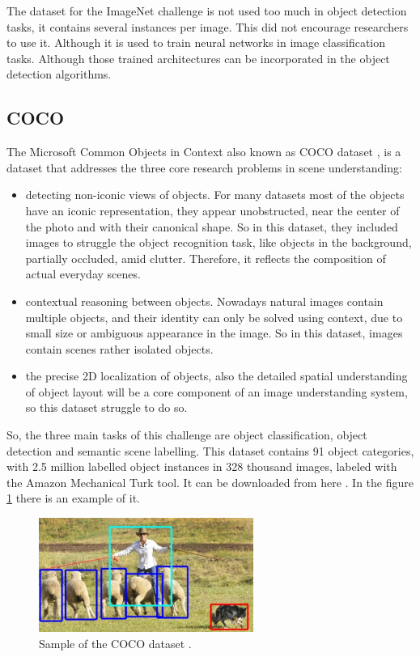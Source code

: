 The dataset for the ImageNet challenge is not used too much in object detection tasks, it contains several instances per image. This did not encourage researchers to use it. Although it is used to train neural networks in image classification tasks. Although those trained architectures can be incorporated in the object detection algorithms.


\subsection{COCO}

The Microsoft Common Objects in Context also known as COCO dataset \cite{coco}, is a dataset that addresses the three core research problems in scene understanding:


\begin{itemize}

\item detecting non-iconic views of objects. For many datasets most of the objects have an iconic representation, they appear unobstructed, near the center of the photo and with their canonical shape. So in this dataset, they included images to struggle the object recognition task, like objects in the background, partially occluded, amid clutter. Therefore, it reflects the composition of actual everyday scenes.

\item contextual reasoning between objects. Nowadays natural images contain multiple objects, and their identity can only be solved using context, due to small size or ambiguous appearance in the image. So in this dataset, images contain scenes rather isolated objects. 

\item the precise 2D localization of objects, also the detailed spatial understanding of object layout will be a core component of an image understanding system, so this dataset struggle to do so.



\end{itemize}


So, the three main tasks of this challenge are object classification, object detection and semantic scene labelling. This dataset contains 91 object categories, with 2.5 million labelled object instances in 328 thousand images, labeled with the Amazon Mechanical Turk tool. It can be downloaded from here \cite{cocoWebsite}. In the figure \ref{cocoss} there is an example of it.


\begin{figure}[hptb]
\centering         
\includegraphics[width=7cm]{datasetExample/coco1.png}
\caption{Sample of the COCO dataset .} \label{cocoss}
\end{figure}



